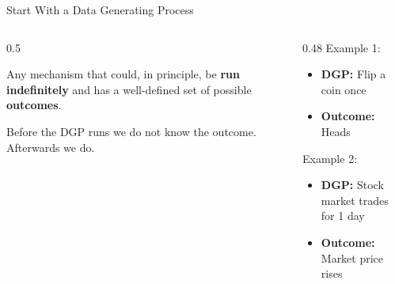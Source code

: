 \documentclass[9pt,english,aspectratio=169]{beamer}
\begin{document}
\begin{frame}{Start With a Data Generating Process}

  \begin{columns}[T]
    \begin{column}{0.5\textwidth}
      \begin{definitionbox}
        Any mechanism that could, in principle, be \textbf{run
        indefinitely} and has a well-defined set of possible \textbf{outcomes}.
      \end{definitionbox}

      \vspace{0.8em}
      Before the DGP runs we do not know the outcome. Afterwards we do.
    \end{column}
    \pause 
    \begin{column}{0.48\textwidth}
      \vspace{0.8em}
      Example 1: 
      \begin{itemize}
        \item \textbf{DGP:} Flip a coin once
        \item \textbf{Outcome:} Heads
      \end{itemize}
      \vspace{1em}
      Example 2: 
      \begin{itemize}
        \item \textbf{DGP:} Stock market trades for 1 day
        \item \textbf{Outcome:} Market price rises
      \end{itemize}     
    \end{column}
  \end{columns}

\end{frame}
\end{document}
